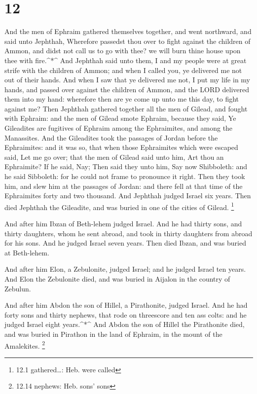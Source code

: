 \hypertarget{section-11}{%
\section{12}\label{section-11}}

 And the men of Ephraim gathered themselves together, and
went northward, and said unto Jephthah, Wherefore passedst thou over to
fight against the children of Ammon, and didst not call us to go with
thee? we will burn thine house upon thee with fire.\^{}*\^{}
 And Jephthah said unto them, I and my people were at great
strife with the children of Ammon; and when I called you, ye delivered
me not out of their hands.  And when I saw that ye delivered
me not, I put my life in my hands, and passed over against the children
of Ammon, and the LORD delivered them into my hand: wherefore then are
ye come up unto me this day, to fight against me?  Then
Jephthah gathered together all the men of Gilead, and fought with
Ephraim: and the men of Gilead smote Ephraim, because they said, Ye
Gileadites are fugitives of Ephraim among the Ephraimites, and among the
Manassites.  And the Gileadites took the passages of Jordan
before the Ephraimites: and it was so, that when those Ephraimites which
were escaped said, Let me go over; that the men of Gilead said unto him,
Art thou an Ephraimite? If he said, Nay;  Then said they
unto him, Say now Shibboleth: and he said Sibboleth: for he could not
frame to pronounce it right. Then they took him, and slew him at the
passages of Jordan: and there fell at that time of the Ephraimites forty
and two thousand.  And Jephthah judged Israel six years.
Then died Jephthah the Gileadite, and was buried in one of the cities of
Gilead. \footnote{12.1 gathered\ldots: Heb. were called}

 And after him Ibzan of Beth-lehem judged Israel.
 And he had thirty sons, and thirty daughters, whom he sent
abroad, and took in thirty daughters from abroad for his sons. And he
judged Israel seven years.  Then died Ibzan, and was buried
at Beth-lehem.

 And after him Elon, a Zebulonite, judged Israel; and he
judged Israel ten years.  And Elon the Zebulonite died, and
was buried in Aijalon in the country of Zebulun.

 And after him Abdon the son of Hillel, a Pirathonite,
judged Israel.  And he had forty sons and thirty nephews,
that rode on threescore and ten ass colts: and he judged Israel eight
years.\^{}*\^{}  And Abdon the son of Hillel the
Pirathonite died, and was buried in Pirathon in the land of Ephraim, in
the mount of the Amalekites. \footnote{12.14 nephews: Heb. sons' sons}

